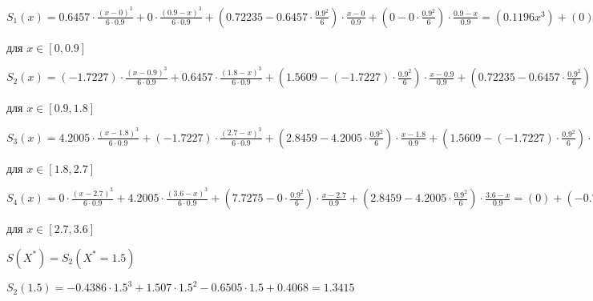 \documentclass[10pt, a4paper]{scrartcl}
\begin{document}
\pagebreak

\(\displaystyle S_1(x) = 0.6457\cdot\frac{(x-0)^3}{6\cdot0.9} + 0\cdot\frac{(0.9 - x)^3}{6\cdot0.9} + (0.72235 - 0.6457\cdot\frac{0.9^2}{6})\cdot\frac{x-0}{0.9} + (0 - 0\cdot\frac{0.9^2}{6})\cdot\frac{0.9 - x}{0.9} = (0.1196 x^3) + (0) + (0.7058 x) + (0) = 0.1196 x^3+0.7058 x\)

для \(\displaystyle x \in [0, 0.9]\)

\vspace{5mm}

\(\displaystyle S_2(x) = (-1.7227)\cdot\frac{(x-0.9)^3}{6\cdot0.9} + 0.6457\cdot\frac{(1.8 - x)^3}{6\cdot0.9} + (1.5609 - (-1.7227)\cdot\frac{0.9^2}{6})\cdot\frac{x-0.9}{0.9} + (0.72235 - 0.6457\cdot\frac{0.9^2}{6})\cdot\frac{1.8 - x}{0.9} = (-0.3190 x^3+0.8613 x^2-0.7752 x+0.2326) + (-0.1196 x^3+0.6457 x^2-1.162 x+0.6974) + (1.993 x-1.793) + (1.270-0.7058 x) = -0.4386 x^3+1.507 x^2-0.6505 x+0.4068\)

для \(\displaystyle x \in [0.9, 1.8]\)

\vspace{5mm}

\(\displaystyle S_3(x) = 4.2005\cdot\frac{(x-1.8)^3}{6\cdot0.9} + (-1.7227)\cdot\frac{(2.7 - x)^3}{6\cdot0.9} + (2.8459 - 4.2005\cdot\frac{0.9^2}{6})\cdot\frac{x-1.8}{0.9} + (1.5609 - (-1.7227)\cdot\frac{0.9^2}{6})\cdot\frac{2.7 - x}{0.9} = (0.7779 x^3-4.200 x^2+7.561 x-4.537) + (0.3190 x^3-2.584 x^2+6.977 x-6.279) + (2.532 x-4.558) + (5.380-1.993 x) = 1.097 x^3-6.785 x^2+15.08 x-9.993\)

для \(\displaystyle x \in [1.8, 2.7]\)

\vspace{5mm}

\(\displaystyle S_4(x) = 0\cdot\frac{(x-2.7)^3}{6\cdot0.9} + 4.2005\cdot\frac{(3.6 - x)^3}{6\cdot0.9} + (7.7275 - 0\cdot\frac{0.9^2}{6})\cdot\frac{x-2.7}{0.9} + (2.8459 - 4.2005\cdot\frac{0.9^2}{6})\cdot\frac{3.6 - x}{0.9} = (0) + (-0.7779 x^3+8.401 x^2-30.24 x+36.29) + (8.586 x-23.18) + (9.115-2.532 x) = -0.7779 x^3+8.401 x^2-24.19 x+22.23\)

для \(\displaystyle x \in [2.7, 3.6]\)

\vspace{5mm}

\(\displaystyle S(X^{*}) = S_2(X^{*} = 1.5)\)

\(\displaystyle S_2(1.5) = -0.4386\cdot1.5^3+1.507\cdot1.5^2-0.6505\cdot1.5+0.4068 = 1.3415\)

\vspace{5mm}
\end{document}
